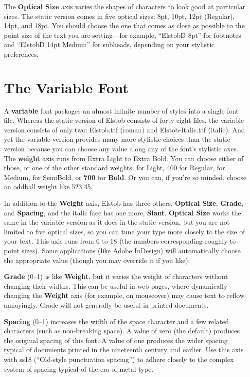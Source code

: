 \documentclass[12pt,letterpaper,openany]{book}
\begin{document}
The \textbf{Optical Size} axis varies the shapes of characters to look good at
particular sizes. The static version comes in five optical sizes: 8pt, 10pt,
12pt (Regular), 14pt, and 18pt. You should choose the one that comes as close
as possible to the point size of the text you are setting---for example, “ElstobD
8pt” for footnotes and “ElstobD 14pt Medium” for subheads, depending on your
stylistic preferences.

\section{The Variable Font}

A \textbf{variable} font packages an almost infinite number
of styles into a single font file. Whereas the static version of Elstob consists
of forty-eight files, the variable version consists of only two: Elstob.ttf
(roman) and Elstob-Italic.ttf (italic). And yet the variable version provides
many more stylistic choices than the static version because you can choose any
value along any of the font’s stylistic axes. The \textbf{weight} axis
runs from { Extra Light} to { Extra Bold}. You
can choose either of those, or one of the other standard weights: {} for
{\light Light}, 400 for Regular, {} for {\medium Medium},
{} for {\semibold SemiBold}, or \textbf{700} for \textbf{Bold}.
Or you can, if you’re so minded, choose {\oddball an oddball weight like
523.45}.

In addition to the \textbf{Weight} axis, Elstob has three others, \textbf{Optical
Size}, \textbf{Grade}, and \textbf{Spacing}, and the italic face has one more, \textbf{Slant}.
\textbf{Optical Size} works the same in the variable version as it does in the
static version, but you are not limited to five optical sizes, so you can tune
your type more closely to the size of your text. This axis runs from 6 to
18 (the numbers corresponding roughly to point sizes). Some applications (like
Adobe InDesign) will automatically
choose the appropriate value (though you may override it if you like).

\textbf{Grade}
(0--1) is like \textbf{Weight}, but it varies the weight of characters without changing
their widths. This can be useful in web pages, where dynamically changing the
\textbf{Weight} axis (for example, on mouseover) may cause text to reflow annoyingly. Grade will
not generally be useful in printed documents.

\textbf{Spacing} (0--1) increases the width of the space character and a few
related characters (such as non-breaking space). A value of zero (the default)
produces the original spacing of this font. A value of one produces the wider
spacing typical of documents printed in the nineteenth century and earlier.
Use this axis with ss18 (“Old-style punctuation spacing”) to adhere closely to
the complex system of spacing typical of the era of metal type.
\end{document}
